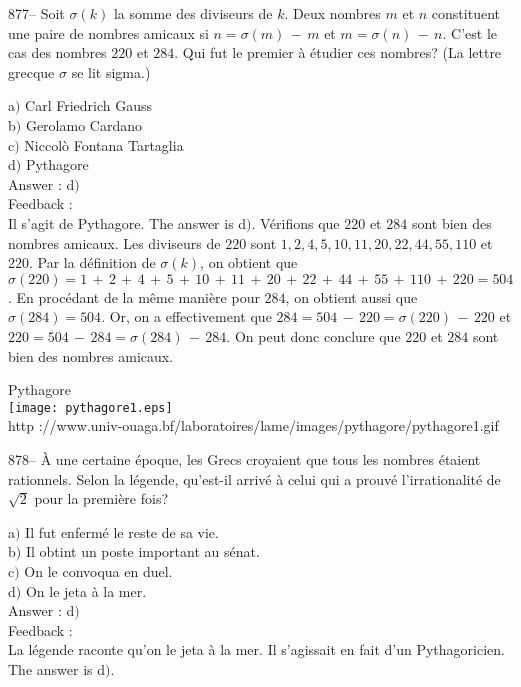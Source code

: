﻿\documentclass[letterpaper, 12pt]{article}
\begin{document}
877-- Soit $\sigma(k)$ la somme des diviseurs de $k$. Deux nombres
$m$ et $n$ constituent une paire de nombres amicaux si
$n=\sigma(m)\,-\,m$ et $m=\sigma(n)\,-\,n$. C'est le cas des nombres
$220$ et $284$. Qui fut le premier \`a \'etudier ces nombres? (La
lettre grecque $\sigma$ se lit sigma.)

a$)$ Carl Friedrich Gauss \\
b$)$ Gerolamo Cardano \\
c$)$ Niccol\`o Fontana Tartaglia\\
d$)$ Pythagore \\

Answer : d$)$\\

Feedback :\\
Il s'agit de Pythagore. The answer is d$)$. V\'erifions que $220$
et $284$ sont bien des nombres amicaux. Les diviseurs de $220$ sont
$1,2,4,5,10,11,20,22,44,55,110$ et $220$. Par la d\'efinition de
$\sigma(k)$, on obtient que
$\sigma(220)=1\,+\,2\,+\,4\,+\,5\,+\,10\,+\,11\,+\,20\,+\,22\,+\,44\,+\,55\,+\,110\,+\,220=504$.
En proc\'edant de la m\^eme mani\`ere pour $284$, on obtient aussi
que $\sigma(284)=504$. Or, on a effectivement que
$284=504\,-\,220=\sigma(220)\,-\,220$ et
$220=504\,-\,284=\sigma(284)\,-\,284$. On peut donc conclure
que $220$ et $284$ sont bien des nombres amicaux. \\

        \begin{center}
        Pythagore\\
    \texttt{[image: pythagore1.eps]}\\
        {\footnotesize http
://www.univ-ouaga.bf/laboratoires/lame/images/pythagore/pythagore1.gif}
    \end{center}

878-- \`A une certaine \'epoque, les Grecs croyaient que tous les
nombres \'etaient rationnels. Selon la l\'egende, qu'est-il arriv\'e
\`a celui qui a prouv\'e l'irrationalit\'e de $\sqrt2$ pour la
premi\`ere fois?

a$)$ Il fut enferm\'e le reste de sa vie. \\
b$)$ Il obtint un poste important au s\'enat. \\
c$)$ On le convoqua en duel. \\
d$)$ On le jeta \`a la mer.\\

Answer : d$)$\\

Feedback : \\
La l\'egende raconte qu'on le jeta \`a la mer. Il s'agissait en fait d'un
Pythagoricien. The answer is d$)$.\\
\end{document}
